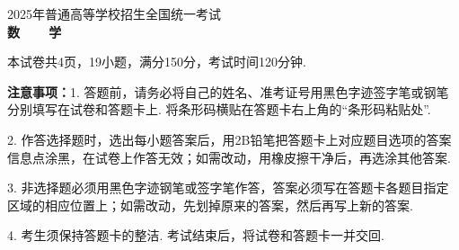 \documentclass[12pt,a4paper]{article}
\begin{document}
	
	\vspace*{0.5cm}
	
	\begin{center}
		{\Large 2025年普通高等学校招生全国统一考试}\\[0.8cm]
		{\LARGE\bfseries 数~~~~学}
	\end{center}
	
	\noindent 本试卷共4页，19小题，满分150分，考试时间120分钟.
	
	\noindent\hangindent=73pt {\bfseries 注意事项：}1. 答题前，请务必将自己的姓名、准考证号用黑色字迹签字笔或钢笔分别填写在试卷和答题卡上.  将条形码横贴在答题卡右上角的“条形码粘贴处”.
	
	\noindent\hangindent=73pt\hspace{61pt}2. 作答选择题时，选出每小题答案后，用2B铅笔把答题卡上对应题目选项的答案信息点涂黑，在试卷上作答无效；如需改动，用橡皮擦干净后，再选涂其他答案.
	
	\noindent\hangindent=73pt\hspace{61pt}3. 非选择题必须用黑色字迹钢笔或签字笔作答，答案必须写在答题卡各题目指定区域的相应位置上；如需改动，先划掉原来的答案，然后再写上新的答案.
	
	\noindent\hangindent=73pt\hspace{61pt}4. 考生须保持答题卡的整洁. 考试结束后，将试卷和答题卡一并交回.
	
	\vspace{0.3cm}
	
\end{document}
